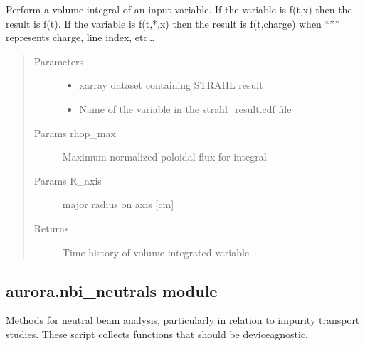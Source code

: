 \documentclass[letterpaper,10pt,english]{sphinxmanual}
\begin{document}
\begin{fulllineitems}
\label{\detokenize{aurora:aurora.particle_conserv.vol_int}}
Perform a volume integral of an input variable. If the variable is f(t,x) then the result is f(t).
If the variable is f(t,*,x) then the result is f(t,charge) when “*” represents charge, line index, etc…
\begin{quote}\begin{description}
\item[{Parameters}] \leavevmode\begin{itemize}
\item {} 
 \textendash{} xarray dataset containing STRAHL result

\item {} 
 \textendash{} Name of the variable in the strahl\_result.cdf file

\end{itemize}

\item[{Params rhop\_max}] \leavevmode
Maximum normalized poloidal flux for integral

\item[{Params R\_axis}] \leavevmode
major radius on axis {[}cm{]}

\item[{Returns}] \leavevmode
Time history of volume integrated variable

\end{description}\end{quote}

\end{fulllineitems}



\subsection{aurora.nbi\_neutrals module}
\label{\detokenize{aurora:module-aurora.nbi_neutrals}}\label{\detokenize{aurora:aurora-nbi-neutrals-module}}
Methods for neutral beam analysis, particularly in relation to impurity transport studies.
These script collects functions that should be device\sphinxhyphen{}agnostic.
\end{document}
